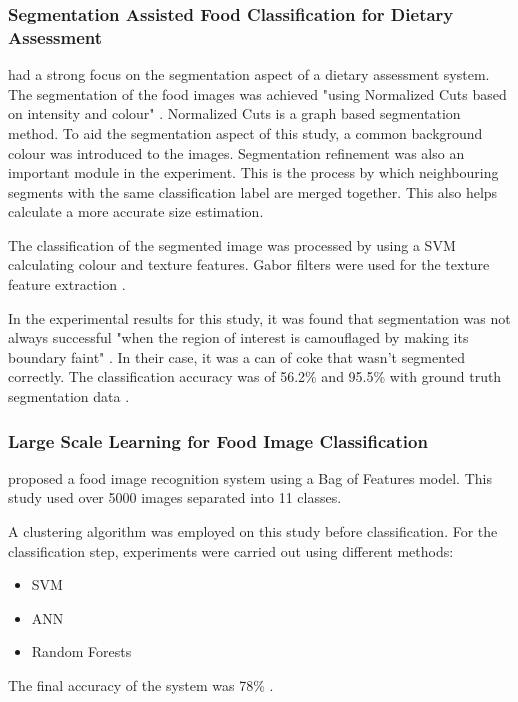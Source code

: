 \subsubsection*{Segmentation Assisted Food Classification for Dietary Assessment}
\parencite{zhu2011segmentation} had a strong focus on the segmentation aspect of a dietary assessment system.
The segmentation of the food images was achieved "using Normalized Cuts based on intensity and colour" \parencite{zhu2011segmentation}.
Normalized Cuts is a graph based segmentation method.
To aid the segmentation aspect of this study, a common background colour was introduced to the images.
Segmentation refinement was also an important module in the experiment.
This is the process by which neighbouring segments with  the same classification label are merged together.
This also helps calculate a more accurate size estimation.

The classification of the segmented image was processed by using a SVM calculating colour and texture features.
Gabor filters were used for the texture feature extraction \parencite{zhu2011segmentation}.

In the experimental results for this study, it was found that segmentation was not always successful "when the region of interest is camouflaged by making its boundary faint" \parencite{zhu2011segmentation}. In their case, it was a can of coke that wasn't segmented correctly.
The classification accuracy was of 56.2\% and 95.5\% with ground truth segmentation data \parencite{zhu2011segmentation}.

\subsubsection*{Large Scale Learning for Food Image Classification}
\parencite{LSL_2015} proposed a food image recognition system using a Bag of Features model.
This study used over 5000 images separated into 11 classes.

A clustering algorithm was employed on this study before classification.
For the classification step, experiments were carried out using different methods:
\begin{itemize}
	\item{SVM}
	\item{ANN}
	\item{Random Forests}
\end{itemize}

The final accuracy of the system was 78\% \parencite{LSL_2015}.

